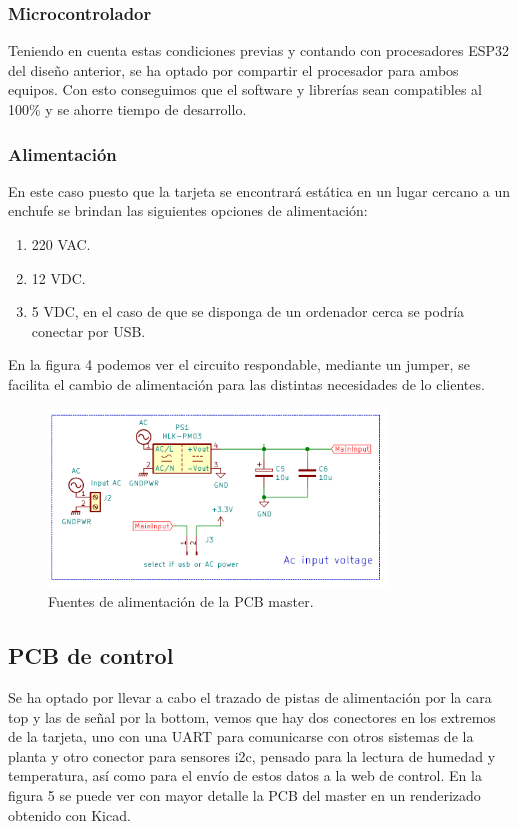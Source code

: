 \documentclass[paper=a4, fontsize=11pt,twoside]{scrartcl}	%
\begin{document}
        \subsubsection{Microcontrolador} 
            Teniendo en cuenta estas condiciones previas y contando con procesadores ESP32 del diseño anterior, se ha optado por compartir 
            el procesador para ambos equipos. Con esto conseguimos que el software y librerías sean compatibles al 100\% y se ahorre tiempo
            de desarrollo.
        \subsubsection{Alimentación} 
            En este caso puesto que la tarjeta se encontrará estática en un lugar cercano a un enchufe se brindan las siguientes opciones
            de alimentación:
            \begin{enumerate}
                \item 220 VAC.
                \item 12 VDC.
                \item 5 VDC, en el caso de que se disponga de un ordenador cerca se podría conectar por USB.
            \end{enumerate}
            En la figura 4 podemos ver el circuito respondable, mediante un jumper, se facilita el cambio de alimentación para las distintas necesidades 
            de lo clientes.
            \begin{center}
                \begin{figure}[h]
                    \centering
                    \includegraphics[width=0.8\textwidth]{../receiver_main_power.PNG}
                    \caption{Fuentes de alimentación de la PCB master.}
                    \label{fig:mesh4}
                \end{figure}    
            \end{center}    
    \subsection{PCB de control}
        Se ha optado por llevar a cabo el trazado de pistas de alimentación por la cara top y las de señal por la bottom, vemos que hay dos 
        conectores en los extremos de la tarjeta, uno con una UART para comunicarse con otros sistemas de la planta y otro conector para sensores
        i2c, pensado para la lectura de humedad y temperatura, así como para el envío de estos datos a la web de control. En la figura 5 se puede 
        ver con mayor detalle la PCB del master en un renderizado obtenido con Kicad.
\end{document}

